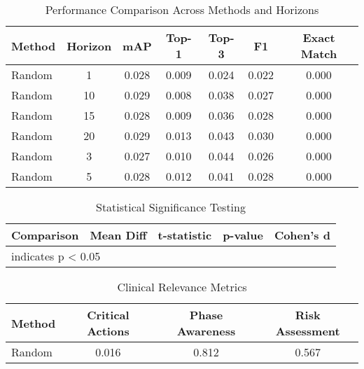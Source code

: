 
\begin{table}[htbp]
\centering
\caption{Performance Comparison Across Methods and Horizons}
\label{tab:main_results}
\begin{tabular}{lcccccc}
\toprule
Method & Horizon & mAP & Top-1 & Top-3 & F1 & Exact Match \\
\midrule
Random & 1 & 0.028 & 0.009 & 0.024 & 0.022 & 0.000 \\
Random & 10 & 0.029 & 0.008 & 0.038 & 0.027 & 0.000 \\
Random & 15 & 0.028 & 0.009 & 0.036 & 0.028 & 0.000 \\
Random & 20 & 0.029 & 0.013 & 0.043 & 0.030 & 0.000 \\
Random & 3 & 0.027 & 0.010 & 0.044 & 0.026 & 0.000 \\
Random & 5 & 0.028 & 0.012 & 0.041 & 0.028 & 0.000 \\

\bottomrule
\end{tabular}
\end{table}



\begin{table}[htbp]
\centering
\caption{Statistical Significance Testing}
\label{tab:statistical_tests}
\begin{tabular}{lcccc}
\toprule
Comparison & Mean Diff & t-statistic & p-value & Cohen's d \\
\midrule

\bottomrule
\multicolumn{5}{l}{\footnotesize * indicates p < 0.05} \\
\end{tabular}
\end{table}



\begin{table}[htbp]
\centering
\caption{Clinical Relevance Metrics}
\label{tab:clinical_metrics}
\begin{tabular}{lccc}
\toprule
Method & Critical Actions & Phase Awareness & Risk Assessment \\
\midrule
Random & 0.016 & 0.812 & 0.567 \\

\bottomrule
\end{tabular}
\end{table}
